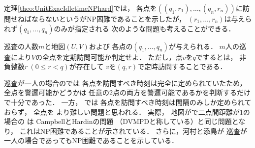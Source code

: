
定理\ref{theo:UnitExacIdletimeNPhard}では，
各点を{\exactTime}$((q_1, r_1), \ldots, (q_n, r_n))$に訪問せねばならないという{\timeSpecifiedPatProb}がNP困難であることを示したが，
$(r_1, \ldots, r_n)$は与えられず$(q_1, \ldots, q_n)$のみが指定される
次のような問題も考えることができる．

\begin{intervalSpecifiedPatrollingProblemDecision}
  巡査の人数$m$と地図$(U, V)$および
  各点の{\exactInterval}$(q_1, \ldots, q_n)$が与えられる．
  $m$人の巡査により$V$の全点を定期訪問可能か判定せよ．
  ただし，点$v$を$q$でするとは，
  非負整数$r\ (0 \leq r < q)$が存在して
  $v$を{\exactTime}$(q, r)$で定時訪問することである．
\end{intervalSpecifiedPatrollingProblemDecision}

巡査が一人の場合の{\timeSpecifiedPatProbDecision}では
各点を訪問すべき時刻は完全に定められていたため，
全点を警邏可能かどうかは
任意の2点の両方を警邏可能であるかを判断するだけで十分であった．
一方，
{\intervalSpecifiedPatProbDecision}では
各点を訪問すべき時刻は間隔のみしか定められておらず，
全点を
より難しい問題と思われる．
実際，
地図が{\graphUnit}で二点間距離が$1$の場合の
{\intervalSpecifiedPatProbDecision}は
CampbellとHardin\cite{campbell2005vehicle}の問題
（DVMPDと称している）と同じ問題となり，
これはNP困難であることが示されている\cite[Theorem~4]{campbell2005vehicle}．
さらに，河村と添島が
巡査が一人の場合であってもNP困難であることを示している\cite[Theorem~20]{kawamura2015simple}．

